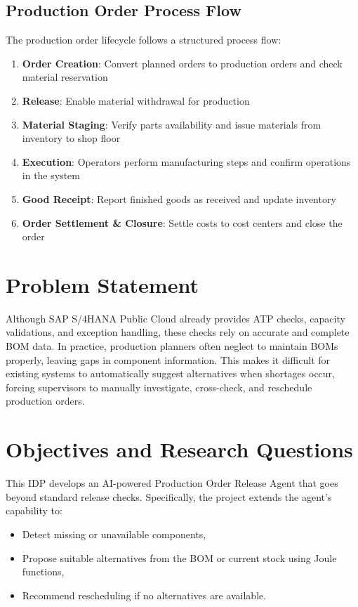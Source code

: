\subsection{Production Order Process Flow}

The production order lifecycle follows a structured process flow:

\begin{enumerate}
    \item \textbf{Order Creation}: Convert planned orders to production orders and check material reservation
    \item \textbf{Release}: Enable material withdrawal for production
    \item \textbf{Material Staging}: Verify parts availability and issue materials from inventory to shop floor
    \item \textbf{Execution}: Operators perform manufacturing steps and confirm operations in the system
    \item \textbf{Good Receipt}: Report finished goods as received and update inventory
    \item \textbf{Order Settlement \& Closure}: Settle costs to cost centers and close the order
\end{enumerate}

\section{Problem Statement}
Although SAP S/4HANA Public Cloud already provides ATP checks, capacity validations, and exception handling, these checks rely on accurate and complete BOM data. In practice, production planners often neglect to maintain BOMs properly, leaving gaps in component information. This makes it difficult for existing systems to automatically suggest alternatives when shortages occur, forcing supervisors to manually investigate, cross-check, and reschedule production orders.

\section{Objectives and Research Questions}
This IDP develops an AI-powered Production Order Release Agent that goes beyond standard release checks. Specifically, the project extends the agent’s capability to:
\begin{itemize}
  \item Detect missing or unavailable components,
  \item Propose suitable alternatives from the BOM or current stock using Joule functions,
  \item Recommend rescheduling if no alternatives are available.
\end{itemize}

